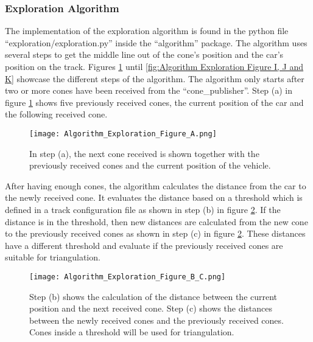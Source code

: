 \subsubsection{Exploration Algorithm} \label{sec:Exploration Algorithm} %
The implementation of the exploration algorithm is found in the python file ``exploration/exploration.py'' inside the ``algorithm'' package. The algorithm uses several steps to get the middle line out of the cone's position and the car's position on the track. Figures \ref{fig:Algorithm Exploration Figure A} until \ref{fig:Algorithm Exploration Figure I, J and K} showcase the different steps of the algorithm. The algorithm only starts after two or more cones have been received from the ``cone\_publisher''. Step (a) in figure \ref{fig:Algorithm Exploration Figure A} shows five previously received cones, the current position of the car and the following received cone.
\begin{figure}[H]
    \centering
    \texttt{[image: Algorithm\_Exploration\_Figure\_A.png]}
    \caption{In step (a), the next cone received is shown together with the previously received cones and the current position of the vehicle.}
    \label{fig:Algorithm Exploration Figure A}
\end{figure}

After having enough cones, the algorithm calculates the distance from the car to the newly received cone. It evaluates the distance based on a threshold which is defined in a track configuration file as shown in step (b) in figure \ref{fig:Algorithm Exploration Figure B and C}. If the distance is in the threshold, then new distances are calculated from the new cone to the previously received cones as shown in step (c) in figure \ref{fig:Algorithm Exploration Figure B and C}. These distances have a different threshold and evaluate if the previously received cones are suitable for triangulation.
\begin{figure}[H]
    \centering
    \texttt{[image: Algorithm\_Exploration\_Figure\_B\_C.png]}
    \caption{Step (b) shows the calculation of the distance between the current position and the next received cone. Step (c) shows the distances between the newly received cones and the previously received cones. Cones inside a threshold will be used for triangulation.}
    \label{fig:Algorithm Exploration Figure B and C}
\end{figure}


